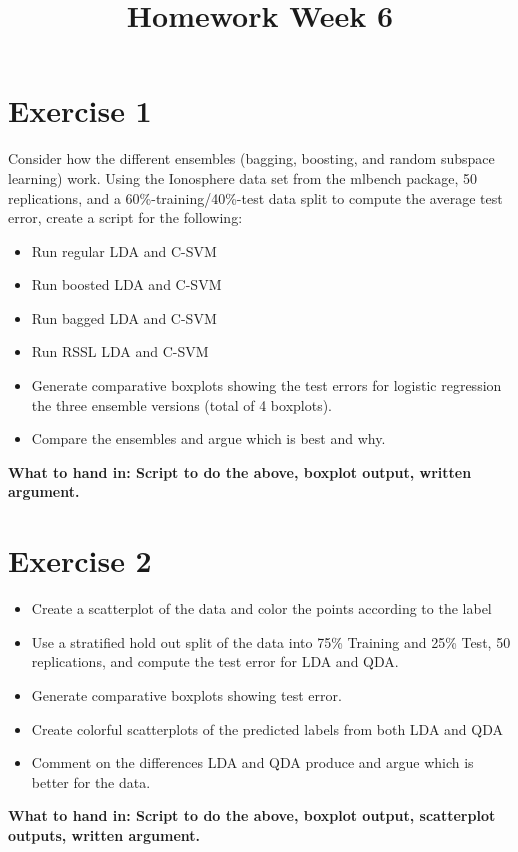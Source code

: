 \documentclass[a4paper]{article}
\begin{document}
\title{Homework Week 6}

\maketitle

\section{Exercise 1}

Consider how the different ensembles (bagging, boosting, and random subspace learning) work. Using the Ionosphere data set from the mlbench package, 50 replications, and a 60\%-training/40\%-test data split to compute the average test error, create a script for the following:

\begin{itemize}
\item Run regular LDA and C-SVM
\item Run boosted LDA and C-SVM
\item Run bagged LDA and C-SVM
\item Run RSSL LDA and C-SVM
\item Generate comparative boxplots showing the test errors for logistic regression  the three ensemble versions (total of 4 boxplots).
\item Compare the ensembles and argue which is best and why.
\end{itemize}

\textbf{What to hand in: Script to do the above, boxplot output, written argument.}

\section{Exercise 2}

\begin{itemize}
\item Create a scatterplot of the data and color the points according to the label
\item Use a stratified hold out split of the data into 75\% Training and 25\% Test, 50 replications, and compute the test error for LDA and QDA.
\item Generate comparative boxplots showing test error.
\item Create colorful scatterplots of the predicted labels from both LDA and QDA
\item Comment on the differences LDA and QDA produce and argue which is better for the data.
\end{itemize}

\textbf{What to hand in: Script to do the above, boxplot output, scatterplot outputs, written argument.}
\end{document}
